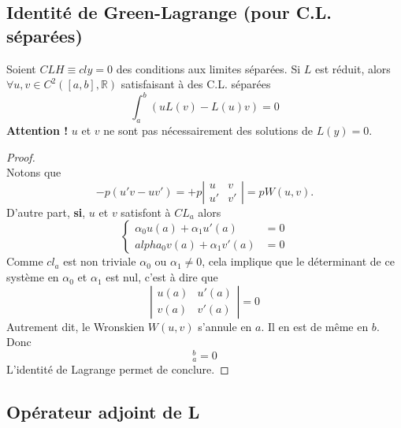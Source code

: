 \documentclass	[11pt, a4paper, openany]{book}
\begin{document}
			\subsection{Identité de Green-Lagrange (pour C.L. séparées)}
			Soient $CLH \equiv cly = 0$ des conditions aux limites séparées. Si $L$ est réduit, alors $\forall u,v \in C^2([a,b],\mathbb{R})$ satisfaisant à des C.L. séparées
			\begin{equation}
				\int_a^b (uL(v) - L(u)v) = 0
			\end{equation}
			\textbf{Attention !} $u$ et $v$ ne sont pas nécessairement des solutions de $L(y) = 0$.
			\begin{proof}
				\ \\
				Notons que
				\begin{equation}
					-p(u'v - uv') = +p\left|\begin{array}{cc}
					u & v\\
					u' & v'
					\end{array}\right| = pW(u,v).
				\end{equation}
				D'autre part, \textbf{si}, $u$ et $v$ satisfont à $CL_a$ alors
				\begin{equation}
					\left\{\begin{array}{ll}
					\alpha_0u(a) + \alpha_1u'(a) &= 0\\alpha_0v(a) + \alpha_1v'(a) &= 0
					\end{array}\right.
				\end{equation}
				Comme $cl_a$ est non triviale $\alpha_0$ ou $\alpha_1 \neq 0$, cela implique que le déterminant de ce système en $\alpha_0$ et $\alpha_1$ est nul, c'est à dire que
				\begin{equation}
					\left|\begin{array}{cc}
					u(a) & u'(a)\\
					v(a) & v'(a)
					\end{array}\right| = 0
				\end{equation}
				Autrement dit, le Wronskien $W(u,v)$ s'annule en $a$. Il en est de même en $b$. Donc
				\begin{equation}
					[p(x)W(x;u,v)]_a^b = 0
				\end{equation}
				L'identité de Lagrange permet de conclure.
			\end{proof}
			
			\subsection{Opérateur adjoint de L}
\end{document}

